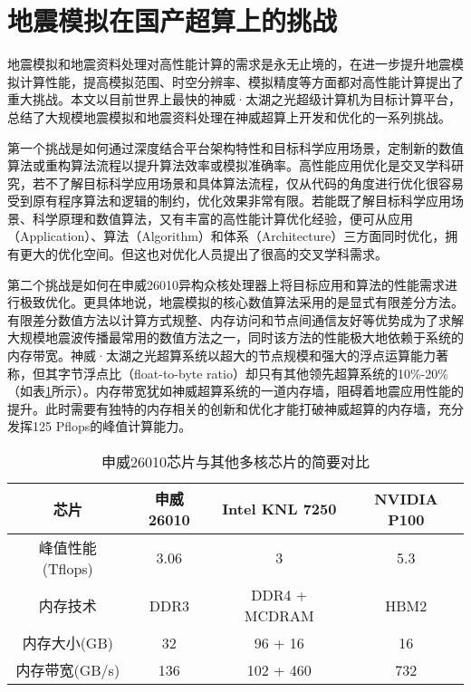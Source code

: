 \section{地震模拟在国产超算上的挑战}

地震模拟和地震资料处理对高性能计算的需求是永无止境的，在进一步提升地震模拟计算性能，提高模拟范围、时空分辨率、模拟精度等方面都对高性能计算提出了重大挑战。本文以目前世界上最快的神威·太湖之光超级计算机为目标计算平台，总结了大规模地震模拟和地震资料处理在神威超算上开发和优化的一系列挑战。

第一个挑战是如何通过深度结合平台架构特性和目标科学应用场景，定制新的数值算法或重构算法流程以提升算法效率或模拟准确率。高性能应用优化是交叉学科研究，若不了解目标科学应用场景和具体算法流程，仅从代码的角度进行优化很容易受到原有程序算法和逻辑的制约，优化效果非常有限。若能既了解目标科学应用场景、科学原理和数值算法，又有丰富的高性能计算优化经验，便可从应用（Application）、算法（Algorithm）和体系（Architecture）三方面同时优化，拥有更大的优化空间。但这也对优化人员提出了很高的交叉学科需求。

第二个挑战是如何在申威26010异构众核处理器上将目标应用和算法的性能需求进行极致优化。更具体地说，地震模拟的核心数值算法采用的是显式有限差分方法。有限差分数值方法以计算方式规整、内存访问和节点间通信友好等优势成为了求解大规模地震波传播最常用的数值方法之一，同时该方法的性能极大地依赖于系统的内存带宽。神威·太湖之光超算系统以超大的节点规模和强大的浮点运算能力著称，但其字节浮点比（float-to-byte ratio）却只有其他领先超算系统的10\%-20\%（如表\ref{tb:proc-comp}所示）。内存带宽犹如神威超算系统的一道内存墙，阻碍着地震应用性能的提升。此时需要有独特的内存相关的创新和优化才能打破神威超算的内存墙，充分发挥125 Pflops的峰值计算能力。

\begin{table}[ht]
\caption{申威26010芯片与其他多核芯片的简要对比}
\label{tb:proc-comp}
\centering
\begin{tabular*}{0.8\columnwidth}{cccc}
\hline\hline
    芯片 & 申威26010 & Intel KNL 7250 & NVIDIA P100 \\\hline
    峰值性能 (Tflops) & 3.06 & 3 & 5.3 \\\hline
    内存技术   & DDR3 & DDR4 + MCDRAM & HBM2 \\\hline
    内存大小(GB) & 32 & 96 + 16 & 16 \\\hline
    内存带宽(GB/s)  & 136 & 102 + 460 & 732 \\\hline
\hline
\end{tabular*}
\end{table}

